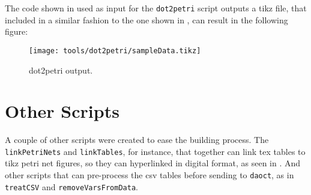 The code shown in  used as input for the
\verb|dot2petri| script outputs a tikz file, that included in a similar fashion
to the one shown in , can result in the following figure:

\begin{figure}[H]
  \centering
  \texttt{[image: tools/dot2petri/sampleData.tikz]}
  \caption{dot2petri output.}
  \label{fig:Dot2automataSampleOutput}
\end{figure}

\section{Other Scripts}
\label{sec:otherScripts}
A couple of other scripts were created to ease the building process. The 
\verb|linkPetriNets| and \verb|linkTables|, for instance, that together can link tex tables to
tikz petri net figures, so they can hyperlinked in digital format, as seen in
. And other scripts that can pre-process the csv
tables before sending to \verb|daoct|, as in \verb|treatCSV| and \verb|removeVarsFromData|.


